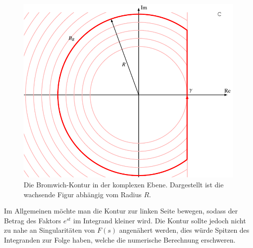 \begin{figure}
\centering
\includegraphics{papers/laplace/images/bromwich.pdf}
\caption{Die Bromwich-Kontur in der komplexen Ebene. Dargestellt ist die wachsende Figur abhängig vom Radius $R$.
\label{laplace:bromwichkontur}
}
\end{figure}

Im Allgemeinen möchte man die Kontur zur linken Seite bewegen, sodass der Betrag des Faktors $e^{st}$ im Integrand kleiner wird.
Die Kontur sollte jedoch nicht zu nahe an Singularitäten von $F(s)$ angenähert werden, dies würde Spitzen des Integranden zur Folge haben, welche die numerische Berechnung erschweren.

